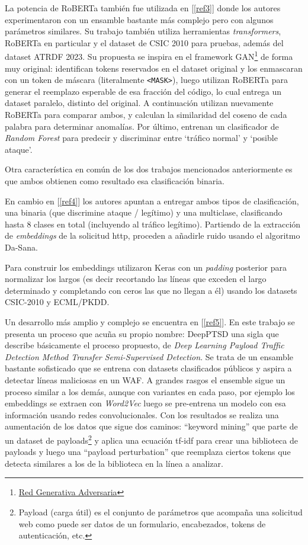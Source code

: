 \documentclass[12pt,a4paper]{article}
\begin{document}
La potencia de RoBERTa también fue utilizada en [\ref{ref3}] donde los autores experimentaron con un ensamble bastante más complejo pero con algunos parámetros similares. Su trabajo también utiliza herramientas \textit{transformers}, RoBERTa en particular y el dataset de CSIC 2010 para pruebas, además del dataset ATRDF 2023. Su propuesta se inspira en el framework GAN\footnote{\href{https://en.wikipedia.org/wiki/Generative_adversarial_network}{Red Generativa Adversaria}} de forma muy original: identifican tokens reservados en el dataset original y los enmascaran con un token de máscara (literalmente \texttt{<MASK>}), luego utilizan RoBERTa para generar el reemplazo esperable de esa fracción del código, lo cual entrega un dataset paralelo, distinto del original. A continuación utilizan nuevamente RoBERTa para comparar ambos, y calculan la similaridad del coseno de cada palabra para determinar anomalías. Por último, entrenan un clasificador de \textit{Random Forest} para predecir y discriminar entre `tráfico normal' y `posible ataque'.

Otra característica en común de los dos trabajos mencionados anteriormente es que ambos obtienen como resultado esa clasificación binaria.

En cambio en [\ref{ref4}] los autores apuntan a entregar ambos tipos de clasificación, una binaria (que discrimine ataque / legítimo) y una multiclase, clasificando hasta 8 clases en total (incluyendo al tráfico legítimo). Partiendo de la extracción de \textit{embeddings} de la solicitud http, proceden a añadirle ruido usando el algoritmo Da-Sana.

Para construir los embeddings utilizaron Keras con un \textit{padding} posterior para normalizar los largos (es decir recortando las líneas que exceden el largo determinado y completando con ceros las que no llegan a él) usando los datasets CSIC-2010 y ECML/PKDD.

Un desarrollo más amplio y complejo se encuentra en [\ref{ref5}]. En este trabajo se presenta un proceso que acuña su propio nombre: DeepPTSD una sigla que describe básicamente el proceso propuesto, de \textit{Deep Learning Payload Traffic Detection Method Transfer Semi-Supervised Detection}. Se trata de un ensamble bastante sofisticado que se entrena con datasets clasificados públicos y aspira a detectar líneas maliciosas en un WAF. A grandes rasgos el ensemble sigue un proceso similar a los demás, aunque con variantes en cada paso, por ejemplo los embeddings se extraen con \textit{Word2Vec} luego se pre-entrena un modelo con esa información usando redes convolucionales. Con los resultados se realiza una aumentación de los datos que sigue dos caminos: ``keyword mining'' que parte de un dataset de payloads\footnote{Payload (carga útil) es el conjunto de parámetros que acompaña una solicitud web como puede ser datos de un formulario, encabezados, tokens de autenticación, etc.} y aplica una ecuación tf-idf para crear una biblioteca de payloads y luego una ``payload perturbation'' que reemplaza ciertos tokens que detecta similares a los de la biblioteca en la línea a analizar.
\end{document}
